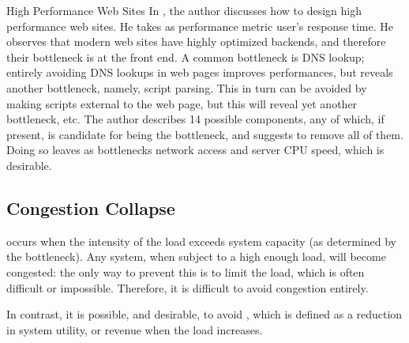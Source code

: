 \begin{ex}{High Performance Web Sites}
In \cite{souders2007hpw}, the author discusses how to design
high performance web sites. He takes as performance metric
user's response time. He observes that modern web sites have
highly optimized backends, and therefore their bottleneck is at
the front end. A common bottleneck is DNS lookup; entirely
avoiding DNS lookups in web pages improves performances, but
reveals another bottleneck, namely, script parsing. This in
turn can be avoided by making scripts external to the web page,
but this will reveal yet another bottleneck, etc. The author
describes 14 possible components, any of which, if present, is
candidate for being the bottleneck, and suggests to remove all
of them. Doing so leaves as bottlenecks network access and
server CPU speed, which is desirable.
\end{ex}
\subsection{Congestion Collapse}
 occurs when the intensity of the
load exceeds system capacity (as determined by
the bottleneck). Any system, when subject to a
high enough load, will become congested: the only
way to prevent this is to limit the load, which
is often difficult or impossible. Therefore, it
is difficult to avoid congestion entirely.

In contrast, it is possible, and desirable, to
avoid , which is defined
as a reduction in system utility, or revenue when
the load increases.

